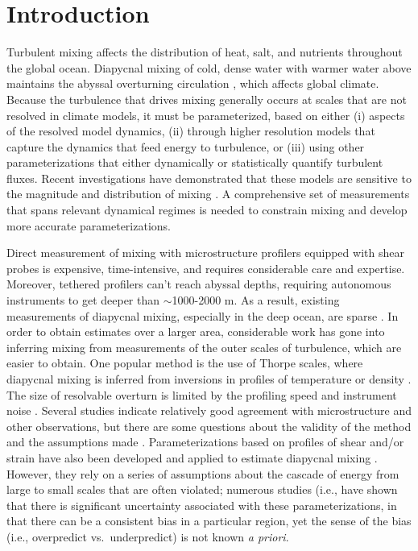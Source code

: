 \documentclass{ametsoc}
\begin{document}


\section{Introduction}

Turbulent mixing affects the distribution of heat, salt, and nutrients throughout the global ocean. Diapycnal mixing  of cold, dense water with warmer water above maintains the abyssal overturning circulation \citep{munk66,munkwunsch98}, which affects global climate. 
Because the turbulence that drives mixing generally occurs at scales that are not resolved in climate models, it must be parameterized, based on either (i) aspects of the resolved model dynamics, (ii) through higher resolution models that capture the dynamics that feed energy to turbulence, or (iii) using other parameterizations that either dynamically or statistically quantify turbulent fluxes.  Recent investigations have demonstrated that these models are sensitive to the magnitude and distribution of mixing \citep{meletetal13}. A comprehensive set of measurements that spans relevant dynamical regimes is needed to constrain mixing and develop more accurate parameterizations.

Direct measurement of mixing with microstructure profilers equipped with shear probes is expensive, time-intensive, and requires considerable care and expertise. Moreover, tethered profilers can't reach abyssal depths, requiring autonomous instruments to get deeper than $\sim$1000-2000 m.  As a result, existing measurements of diapycnal mixing, especially in the deep ocean,  are sparse \citep{waterhouseetal14}. In order to obtain estimates over a larger area, considerable work has gone into inferring mixing from measurements of the outer scales of turbulence, which are easier to obtain. One popular method is the use of Thorpe scales, where diapycnal mixing is inferred from inversions in profiles of temperature or density  \citep{thorpe77,dillon82}. The size of resolvable overturn is limited by the profiling speed and instrument noise \citep{galbraithkelley96}. Several studies indicate relatively good agreement with microstructure and other observations, but there are some questions about the validity of the method and the assumptions made \citep{materetal15,scotti15}. Parameterizations based on profiles of shear and/or strain have also been developed and applied to estimate diapycnal mixing \citep{gregg89a,kunzeetal06,polzinetal13,whalenetal12,whalenetal15}.  However, they rely on a series of assumptions about the cascade of energy from large to small scales that are often violated; numerous studies (i.e., \cite{watermanetal13} have shown that there is significant uncertainty associated with these parameterizations, in that there can be a consistent bias in a particular region, yet the sense of the bias (i.e., overpredict vs.\ underpredict) is not known {\em a priori}. 
\end{document}

